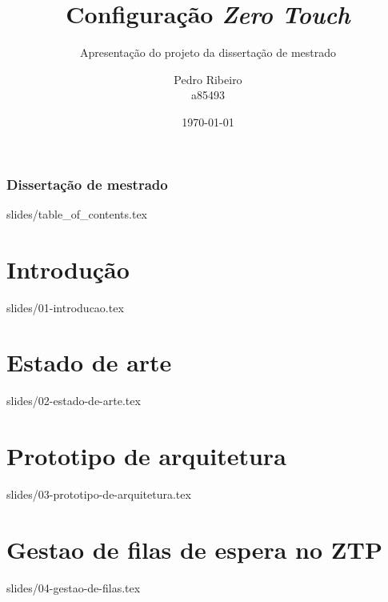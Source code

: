 \documentclass{beamer}
\title{Configuração \textit{Zero Touch}}
\begin{document}
\author[Pedro Ribeiro]{
    \parbox{2.5cm}{%
        \centering Pedro Ribeiro\\a85493
    }%
}


\subtitle{\tiny{Apresentação do projeto da dissertação de mestrado}}


\date{\today}


\begin{frame}
    \frametitle{Dissertação de mestrado}
    \titlepage
\end{frame}

{slides/table_of_contents.tex}

\section{Introdução}
{slides/01-introducao.tex}

\section{Estado de arte}
{slides/02-estado-de-arte.tex}

\section{Prototipo de arquitetura}
{slides/03-prototipo-de-arquitetura.tex}

\section{Gestao de filas de espera no ZTP}
{slides/04-gestao-de-filas.tex}
\end{document}
